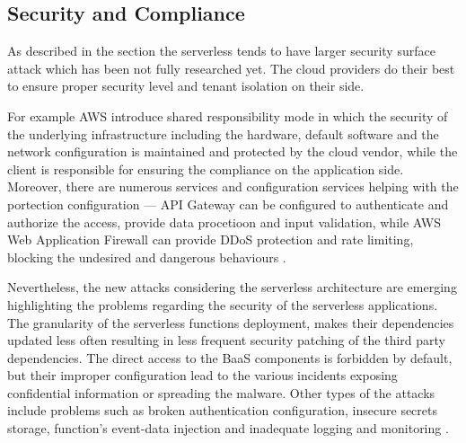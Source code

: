 

\subsection*{Security and Compliance}

As described in the section \label{chapter:serverless-security-concerns} the serverless tends to have larger security surface attack which has been not fully researched yet. 
The cloud providers do their best to ensure proper security level and tenant isolation on their side. 

For example AWS introduce shared responsibility mode in which the security of the underlying infrastructure including the hardware, default software and the network configuration is maintained and protected by the cloud vendor, while the client is responsible for ensuring the compliance on the application side.
Moreover, there are numerous services and configuration services helping with the portection configuration --- API Gateway can be configured to authenticate and authorize the access, provide data procetioon and input validation, while AWS Web Application Firewall can provide DDoS protection and rate limiting, blocking the undesired and dangerous behaviours \cite{EvaluationOfServerlessApplicationProgrammingModel}.

Nevertheless, the new attacks considering the serverless architecture are emerging highlighting the problems regarding the security of the serverless applications. The granularity of the serverless functions deployment, makes their dependencies updated less often resulting in less frequent security patching of the third party dependencies. 
The direct access to the BaaS components is forbidden by default, but their improper configuration lead to the various incidents exposing confidential information or spreading the malware.
Other types of the attacks include problems such as broken authentication configuration, insecure secrets storage, function's event-data injection and inadequate logging and monitoring \cite{EvaluationOfServerlessApplicationProgrammingModel}.

